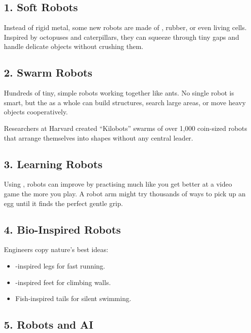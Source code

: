 \subsection*{1. Soft Robots}

Instead of rigid metal, some new robots are made of , rubber,
or even living cells. Inspired by octopuses and caterpillars, they can
squeeze through tiny gaps and handle delicate objects without crushing them.

\subsection*{2. Swarm Robots}

Hundreds of tiny, simple robots working together like ants. No single robot
is smart, but the  as a whole can build structures, search large areas,
or move heavy objects cooperatively.

\begin{funfact}
  Researchers at Harvard created ``Kilobots'' \textemdash{} swarms of over
  1,000 coin-sized robots that arrange themselves into shapes
  without any central leader.
\end{funfact}

\subsection*{3. Learning Robots}

Using , robots can improve by practising \textemdash{}
much like you get better at a video game the more you play.
A robot arm might try thousands of ways to pick up an egg until
it finds the perfect gentle grip.

\subsection*{4. Bio-Inspired Robots}

Engineers copy nature's best ideas:
\begin{itemize}
  \item {}-inspired legs for fast running.
  \item {}-inspired feet for climbing walls.
  \item Fish-inspired tails for silent swimming.
\end{itemize}

\subsection*{5. Robots and AI}

